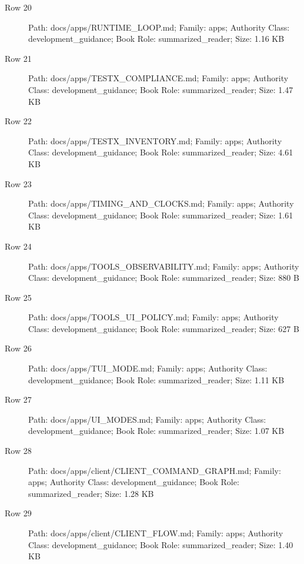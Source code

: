 \documentclass[9pt,a4paper]{book}
\begin{document}
\begin{description}
\item[Row 20] Path: docs/\allowbreak{}apps/\allowbreak{}RUNTIME\_\allowbreak{}LOOP.\allowbreak{}md; Family: apps; Authority Class: development\_\allowbreak{}guidance; Book Role: summarized\_\allowbreak{}reader; Size: 1.\allowbreak{}16 KB
\item[Row 21] Path: docs/\allowbreak{}apps/\allowbreak{}TESTX\_\allowbreak{}COMPLIANCE.\allowbreak{}md; Family: apps; Authority Class: development\_\allowbreak{}guidance; Book Role: summarized\_\allowbreak{}reader; Size: 1.\allowbreak{}47 KB
\item[Row 22] Path: docs/\allowbreak{}apps/\allowbreak{}TESTX\_\allowbreak{}INVENTORY.\allowbreak{}md; Family: apps; Authority Class: development\_\allowbreak{}guidance; Book Role: summarized\_\allowbreak{}reader; Size: 4.\allowbreak{}61 KB
\item[Row 23] Path: docs/\allowbreak{}apps/\allowbreak{}TIMING\_\allowbreak{}AND\_\allowbreak{}CLOCKS.\allowbreak{}md; Family: apps; Authority Class: development\_\allowbreak{}guidance; Book Role: summarized\_\allowbreak{}reader; Size: 1.\allowbreak{}61 KB
\item[Row 24] Path: docs/\allowbreak{}apps/\allowbreak{}TOOLS\_\allowbreak{}OBSERVABILITY.\allowbreak{}md; Family: apps; Authority Class: development\_\allowbreak{}guidance; Book Role: summarized\_\allowbreak{}reader; Size: 880 B
\item[Row 25] Path: docs/\allowbreak{}apps/\allowbreak{}TOOLS\_\allowbreak{}UI\_\allowbreak{}POLICY.\allowbreak{}md; Family: apps; Authority Class: development\_\allowbreak{}guidance; Book Role: summarized\_\allowbreak{}reader; Size: 627 B
\item[Row 26] Path: docs/\allowbreak{}apps/\allowbreak{}TUI\_\allowbreak{}MODE.\allowbreak{}md; Family: apps; Authority Class: development\_\allowbreak{}guidance; Book Role: summarized\_\allowbreak{}reader; Size: 1.\allowbreak{}11 KB
\item[Row 27] Path: docs/\allowbreak{}apps/\allowbreak{}UI\_\allowbreak{}MODES.\allowbreak{}md; Family: apps; Authority Class: development\_\allowbreak{}guidance; Book Role: summarized\_\allowbreak{}reader; Size: 1.\allowbreak{}07 KB
\item[Row 28] Path: docs/\allowbreak{}apps/\allowbreak{}client/\allowbreak{}CLIENT\_\allowbreak{}COMMAND\_\allowbreak{}GRAPH.\allowbreak{}md; Family: apps; Authority Class: development\_\allowbreak{}guidance; Book Role: summarized\_\allowbreak{}reader; Size: 1.\allowbreak{}28 KB
\item[Row 29] Path: docs/\allowbreak{}apps/\allowbreak{}client/\allowbreak{}CLIENT\_\allowbreak{}FLOW.\allowbreak{}md; Family: apps; Authority Class: development\_\allowbreak{}guidance; Book Role: summarized\_\allowbreak{}reader; Size: 1.\allowbreak{}40 KB

\end{description}
\end{document}
